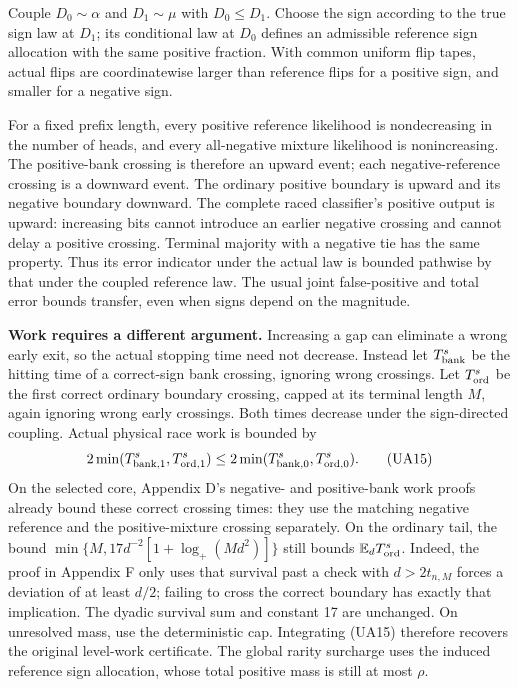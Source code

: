 Couple $D_0\sim\alpha$ and $D_1\sim\mu$ with $D_0\le D_1$. Choose the sign
according to the true sign law at $D_1$; its conditional law at $D_0$ defines
an admissible reference sign allocation with the same positive fraction.
With common uniform flip tapes, actual flips are coordinatewise larger than
reference flips for a positive sign, and smaller for a negative sign.

For a fixed prefix length, every positive reference likelihood is
nondecreasing in the number of heads, and every all-negative mixture
likelihood is nonincreasing. The positive-bank crossing is therefore an
upward event; each negative-reference crossing is a downward event. The
ordinary positive boundary is upward and its negative boundary downward.
The complete raced classifier's positive output is upward: increasing bits
cannot introduce an earlier negative crossing and cannot delay a positive
crossing. Terminal majority with a negative tie has the same property.
Thus its error indicator under the actual law is bounded pathwise by that
under the coupled reference law. The usual joint false-positive and total
error bounds transfer, even when signs depend on the magnitude.

\textbf{Work requires a different argument.} Increasing a gap can eliminate a
wrong early exit, so the actual stopping time need not decrease. Instead
let $T_{\rm bank}^{s}$ be the hitting time of a correct-sign bank crossing,
ignoring wrong crossings. Let $T_{\rm ord}^{s}$ be the first correct ordinary
boundary crossing, capped at its terminal length $M$, again ignoring wrong
early crossings. Both times decrease under the sign-directed coupling.
Actual physical race work is bounded by
\[
 2\min(T_{{\rm bank},1}^{s},T_{{\rm ord},1}^{s})
 \le2\min(T_{{\rm bank},0}^{s},T_{{\rm ord},0}^{s}).     \tag{UA15}
\]
On the selected core, Appendix D's negative- and positive-bank work proofs
already bound these correct crossing times: they use the matching negative
reference and the positive-mixture crossing separately. On the ordinary
tail, the bound
$\min\{M,17d^{-2}[1+\log_+(Md^2)]\}$ still bounds $\mathbb E_d T_{\rm ord}^{s}$.
Indeed, the proof in Appendix F only uses that survival past a check with
$d>2t_{n,M}$ forces a deviation of at least $d/2$; failing to cross the
correct boundary has exactly that implication. The dyadic survival sum and
constant 17 are unchanged. On unresolved mass, use the deterministic cap.
Integrating (UA15) therefore recovers the original level-work certificate.
The global rarity surcharge uses the induced reference sign allocation,
whose total positive mass is still at most $\rho$.

